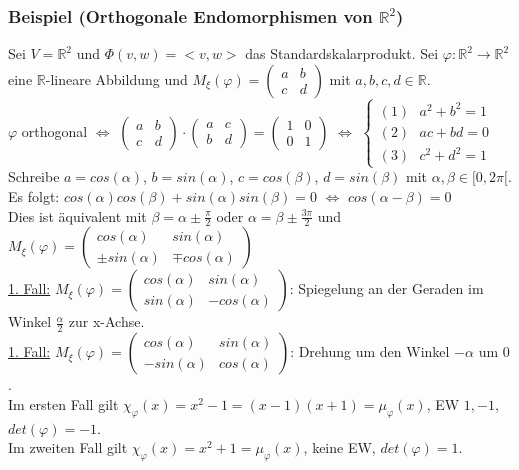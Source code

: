 \documentclass[a4paper]{article}
\newcommand{\ul}{\underline}
\let\phi\varphi
\begin{document}
\subsubsection{Beispiel (Orthogonale Endomorphismen von \(\mathbb{R}^2\))}
Sei \(V=\mathbb{R}^2\) und \(\Phi(v,w)=<v,w>\) das Standardskalarprodukt. Sei \(\phi:\mathbb{R}^2\rightarrow\mathbb{R}^2\) eine \(\mathbb{R}\)-lineare Abbildung und \(M_\xi(\phi)=\begin{pmatrix}
a & b\\
c & d
\end{pmatrix}\) mit \(a,b,c,d\in\mathbb{R}\).\\
\(\phi\) orthogonal \(\Leftrightarrow\) \(\begin{pmatrix}
a & b\\
c & d
\end{pmatrix}\cdot\begin{pmatrix}
a & c\\
b & d
\end{pmatrix}=\begin{pmatrix}
1 & 0\\
0 & 1
\end{pmatrix}\) \(\Leftrightarrow\) \(\begin{cases}
(1)\text{ }a^2+b^2=1\\
(2)\text{ }ac+bd=0\\
(3)\text{ }c^2+d^2=1
\end{cases}\)\\
Schreibe \(a=cos(\alpha)\), \(b=sin(\alpha)\), \(c=cos(\beta)\), \(d=sin(\beta)\) mit \(\alpha, \beta\in [0,2\pi[\). Es folgt: \(cos(\alpha)cos(\beta)+sin(\alpha)sin(\beta)=0\) \(\Leftrightarrow\) \(cos(\alpha-\beta)=0\)\\
Dies ist äquivalent mit \(\beta=\alpha\pm\frac{\pi}{2}\) oder \(\alpha=\beta\pm\frac{3\pi}{2}\) und \(M_\xi(\phi)=\begin{pmatrix}
cos(\alpha) & sin(\alpha)\\
\pm sin(\alpha) & \mp cos(\alpha)
\end{pmatrix}\)\\
\ul{1. Fall:} \(M_\xi(\phi)=\begin{pmatrix}
cos(\alpha) & sin(\alpha)\\
sin(\alpha) & -cos(\alpha)
\end{pmatrix}\): Spiegelung an der Geraden im Winkel \(\frac{\alpha}{2}\) zur x-Achse.\\
\ul{1. Fall:} \(M_\xi(\phi)=\begin{pmatrix}
cos(\alpha) & sin(\alpha)\\
-sin(\alpha) & cos(\alpha)
\end{pmatrix}\): Drehung um den Winkel \(-\alpha\) um \(0\).\\
Im ersten Fall gilt \(\chi_\phi(x)=x^2-1=(x-1)(x+1)=\mu_\phi(x)\), EW \(1,-1\), \(det(\phi)=-1\).\\
Im zweiten Fall gilt \(\chi_\phi(x)=x^2+1=\mu_\phi(x)\), keine EW, \(det(\phi)=1\).
\end{document}
